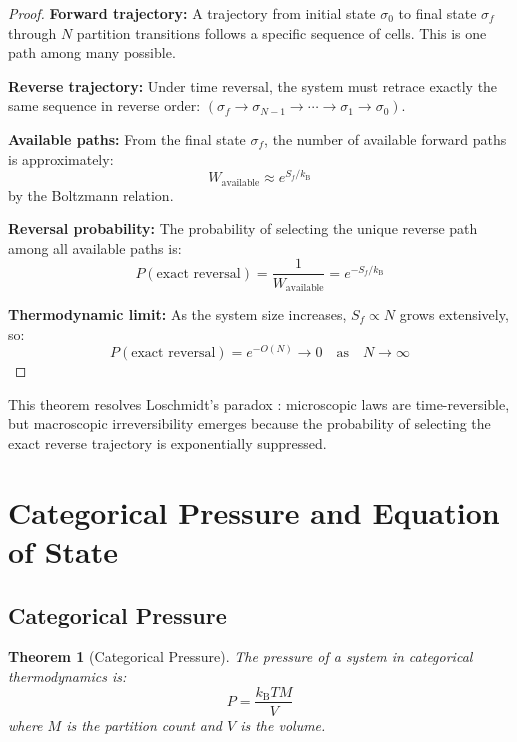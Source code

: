 \documentclass[twocolumn,10pt,twoside]{article}
\newtheorem{theorem}{Theorem}[section]
\newcommand{\kb}{k_{\mathrm{B}}}
\begin{document}
\begin{proof}
\textbf{Forward trajectory:} A trajectory from initial state $\sigma_0$ to final state $\sigma_f$ through $N$ partition transitions follows a specific sequence of cells. This is one path among many possible.

\textbf{Reverse trajectory:} Under time reversal, the system must retrace exactly the same sequence in reverse order: $(\sigma_f \to \sigma_{N-1} \to \cdots \to \sigma_1 \to \sigma_0)$.

\textbf{Available paths:} From the final state $\sigma_f$, the number of available forward paths is approximately:
\begin{equation}
W_{\text{available}} \approx e^{S_f/\kb}
\end{equation}
by the Boltzmann relation.

\textbf{Reversal probability:} The probability of selecting the unique reverse path among all available paths is:
\begin{equation}
P(\text{exact reversal}) = \frac{1}{W_{\text{available}}} = e^{-S_f/\kb}
\end{equation}

\textbf{Thermodynamic limit:} As the system size increases, $S_f \propto N$ grows extensively, so:
\begin{equation}
P(\text{exact reversal}) = e^{-O(N)} \to 0 \quad \text{as} \quad N \to \infty
\end{equation}
\end{proof}

This theorem resolves Loschmidt's paradox \cite{loschmidt1876}: microscopic laws are time-reversible, but macroscopic irreversibility emerges because the probability of selecting the exact reverse trajectory is exponentially suppressed.

\section{Categorical Pressure and Equation of State}

\subsection{Categorical Pressure}

\begin{theorem}[Categorical Pressure]
\label{thm:pressure}
The pressure of a system in categorical thermodynamics is:
\begin{equation}
P = \frac{\kb T M}{V}
\label{eq:categorical_pressure}
\end{equation}
where $M$ is the partition count and $V$ is the volume.
\end{theorem}
\end{document}
